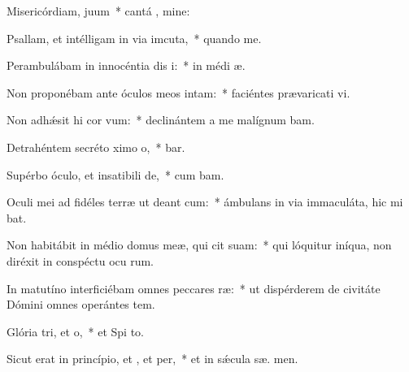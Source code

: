 \item Misericórdiam,  juum~* cantá , mine:
\item Psallam, et intélligam in via imcuta,~* quando   me.
\item Perambulábam in innocéntia dis i:~* in médi  æ.
\item Non proponébam ante óculos meos  intam:~* faciéntes prævaricati vi.
\item Non adhǽsit hi cor vum:~* declinántem a me malígnum  bam.
\item Detrahéntem secréto ximo o,~*  bar.
\item Supérbo óculo, et insatibili de,~* cum   bam.
\item Oculi mei ad fidéles terræ ut deant cum:~* ámbulans in via immaculáta, hic mi bat.
\item Non habitábit in médio domus meæ, qui cit suam:~* qui lóquitur iníqua, non diréxit in conspéctu ocu rum.
\item In matutíno interficiébam omnes peccares ræ:~* ut dispérderem de civitáte Dómini omnes operántes tem.
\item Glória tri, et o,~* et Spi to.
\item Sicut erat in princípio, et , et per,~* et in sǽcula sæ. men.
